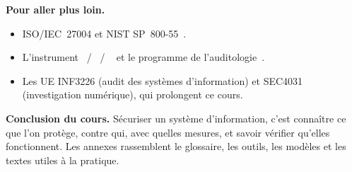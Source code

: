 \bigskip

\begin{boxinfo}
\textbf{Pour aller plus loin.}
\begin{itemize}
    \item ISO/IEC~27004 et NIST SP~800-55~\cite{iso27004_2016,nist80055}.
    \item L'instrument \OUI{}~/ \NON{}~/ \NEK{}~\cite{minka2026nek} et le
          programme de l'auditologie~\cite{minka2026auditologie}.
    \item Les UE INF3226 (audit des systèmes d'information) et SEC4031
          (investigation numérique), qui prolongent ce cours.
\end{itemize}
\end{boxinfo}

\begin{boxinfo}
\textbf{Conclusion du cours.} Sécuriser un système d'information, c'est
connaître ce que l'on protège, contre qui, avec quelles mesures, et savoir
vérifier qu'elles fonctionnent. Les annexes rassemblent le glossaire, les
outils, les modèles et les textes utiles à la pratique.
\end{boxinfo}
